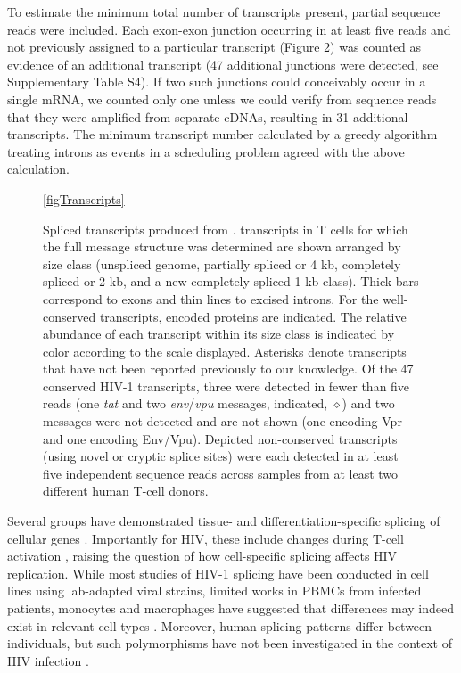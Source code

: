 \documentclass[../sherrill-Mix_thesis.tex]{subfiles}
\begin{document}
To estimate the minimum total number of transcripts present, partial sequence reads were included. Each exon-exon junction occurring in at least five reads and not previously assigned to a particular transcript (Figure 2) was counted as evidence of an additional transcript (47 additional junctions were detected, see Supplementary Table S4). If two such junctions could conceivably occur in a single mRNA, we counted only one unless we could verify from sequence reads that they were amplified from separate cDNAs, resulting in 31 additional transcripts. The minimum transcript number calculated by a greedy algorithm treating introns as events in a scheduling problem agreed with the above calculation. 

\begin{figure}
	\centering
	\caption[Spliced transcripts produced from \hivEight{}]{Spliced transcripts produced from \hivEight{}. \hivEight{} transcripts in T cells for which the full message structure was determined are shown arranged by size class (unspliced genome, partially spliced or 4 kb, completely spliced or 2 kb, and a new completely spliced 1 kb class). Thick bars correspond to exons and thin lines to excised introns. For the well-conserved transcripts, encoded proteins are indicated. The relative abundance of each transcript within its size class is indicated by color according to the scale displayed. Asterisks denote transcripts that have not been reported previously to our knowledge. Of the 47 conserved HIV-1 transcripts, three were detected in fewer than five reads (one \textit{tat} and two \textit{env}/\textit{vpu} messages, indicated, $\diamond$) and two messages were not detected and are not shown (one encoding Vpr and one encoding Env/Vpu). Depicted non-conserved transcripts (using novel or cryptic splice sites) were each detected in at least five independent sequence reads across samples from at least two different human T-cell donors.}
	\ref{figTranscripts}
\end{figure}


Several groups have demonstrated tissue- and differentiation-specific splicing of cellular genes \citep{Wang2008,Grabowski2011,Llorian2011}. Importantly for HIV, these include changes during T-cell activation \citep{Ip2007,Topp2008}, raising the question of how cell-specific splicing affects HIV replication. While most studies of HIV-1 splicing have been conducted in cell lines using lab-adapted viral strains, limited works in PBMCs from infected patients, monocytes and macrophages have suggested that differences may indeed exist in relevant cell types \citep{Carrera2010,Saltarelli1996,Sonza2002,Dowling2008}. Moreover, human splicing patterns differ between individuals, but such polymorphisms have not been investigated in the context of HIV infection \citep{Hull2007,Kwan2007}.
\end{document}
